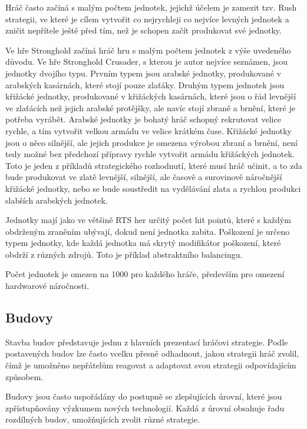 Hráč často začíná s malým počtem jednotek, jejichž účelem je zamezit tzv. Rush strategii, ve které je cílem vytvořit co nejrychleji co nejvíce levných jednotek a zničit nepřítele ještě před tím, než je schopen začít produkovat své jednotky.

Ve hře Stronghold začíná hráč hru s malým počtem jednotek z výše uvedeného důvodu. Ve hře Stronghold Crusader, s kterou je autor nejvíce seznámen, jsou jednotky dvojího typu. Prvním typem jsou arabské jednotky, produkované v arabských kasárnách, které stojí pouze zlaťáky. Druhým typem jednotek jsou křižácké jednotky, produkované v křižáckých kasárnách, které jsou o řád levnější ve zlaťácích než jejich arabské protějšky, ale navíc stojí zbraně a brnění, které je potřeba vyrábět. Arabské jednotky je bohatý hráč schopný rekrutovat velice rychle, a tím vytvořit velkou armádu ve velice krátkém čase. Křižácké jednotky jsou o něco silnější, ale jejich produkce je omezena výrobou zbraní a brnění, není tedy možné bez předchozí přípravy rychle vytvořit armádu křižáckých jednotek. Toto je jeden z příkladů strategického rozhodnutí, které musí hráč učinit, a to zda bude produkovat ve zlatě levnější, silnější, ale časově a surovinově náročnější křižácké jednotky, nebo se bude soustředit na vydělávání zlata a rychlou produkci slabších arabských jednotek. 

Jednotky mají jako ve většině RTS her určitý počet hit pointů, které s každým obdrženým zraněním ubývají, dokud není jednotka zabita. Poškození je určeno typem jednotky, kde každá jednotka má skrytý modifikátor poškození, které obdrží z různých zdrojů.
 Toto je příklad abstraktního balancingu.

Počet jednotek je omezen na 1000 pro každého hráče, především pro omezení hardwarové náročnosti. 

\subsection{Budovy}
Stavba budov představuje jednu z hlavních prezentací hráčovi strategie. Podle postavených budov lze často vcelku přesně odhadnout, jakou strategii hráč zvolil, čímž je umožněno nepřátelům reagovat a adaptovat svou strategii odpovídajícím způsobem. 

Budovy jsou často uspořádány do postupně se zlepšujících úrovní, které jsou zpřístupňovány výzkumem nových technologií.  Každá z úrovní obsahuje řadu rozdílných budov, umožňujících zvolit různé strategie. 

